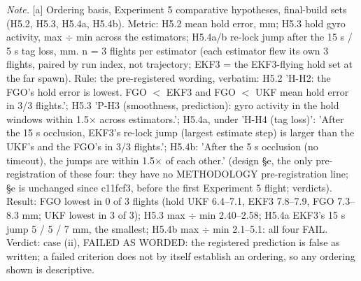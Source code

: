 \begin{table}[htbp]
\textit{Note.} [a] Ordering basis, Experiment 5 comparative hypotheses, final-build sets (H5.2, H5.3, H5.4a, H5.4b). Metric: H5.2 mean hold error, mm; H5.3 hold gyro activity, max $\div$ min across the estimators; H5.4a/b re-lock jump after the 15 s / 5 s tag loss, mm. n = 3 flights per estimator (each estimator flew its own 3 flights, paired by run index, not trajectory; EKF3 = the EKF3-flying hold set at the far spawn). Rule: the pre-registered wording, verbatim: H5.2 'H-H2: the FGO's hold error is lowest. FGO $<$ EKF3 and FGO $<$ UKF mean hold error in 3/3 flights.'; H5.3 'P-H3 (smoothness, prediction): gyro activity in the hold windows within 1.5$\times$ across estimators.'; H5.4a, under 'H-H4 (tag loss)': 'After the 15 s occlusion, EKF3's re-lock jump (largest estimate step) is larger than the UKF's and the FGO's in 3/3 flights.'; H5.4b: 'After the 5 s occlusion (no timeout), the jumps are within 1.5$\times$ of each other.' (design \S{}e, the only pre-registration of these four: they have no METHODOLOGY pre-registration line; \S{}e is unchanged since c11fcf3, before the first Experiment 5 flight; verdicts). Result: FGO lowest in 0 of 3 flights (hold UKF 6.4--7.1, EKF3 7.8--7.9, FGO 7.3--8.3 mm; UKF lowest in 3 of 3); H5.3 max $\div$ min 2.40--2.58; H5.4a EKF3's 15 s jump 5 / 5 / 7 mm, the smallest; H5.4b max $\div$ min 2.1--5.1: all four FAIL. Verdict: case (ii), FAILED AS WORDED: the registered prediction is false as written; a failed criterion does not by itself establish an ordering, so any ordering shown is descriptive.\par
\end{table}
